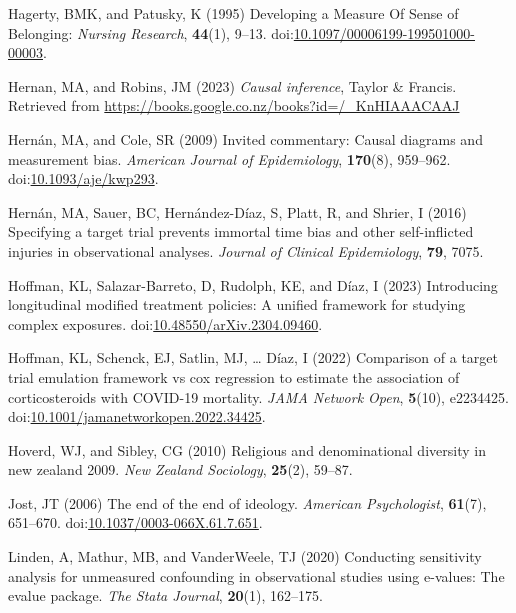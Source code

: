 \documentclass[
  singlecolumn]{article}
\newlength{\cslhangindent}
\newenvironment{CSLReferences}[2] %
 {\begin{list}{}{%
  \setlength{\itemindent}{0pt}
  \setlength{\leftmargin}{0pt}
  \setlength{\parsep}{0pt}
  \ifodd #1
   \setlength{\leftmargin}{\cslhangindent}
   \setlength{\itemindent}{-1\cslhangindent}
  \fi
  \setlength{\itemsep}{#2\baselineskip}}}
 {\end{list}}
\begin{document}
\begin{CSLReferences}{1}{0}
Hagerty, BMK, and Patusky, K (1995) Developing a Measure Of Sense of
Belonging: \emph{Nursing Research}, \textbf{44}(1), 9--13.
doi:\href{https://doi.org/10.1097/00006199-199501000-00003}{10.1097/00006199-199501000-00003}.

Hernan, MA, and Robins, JM (2023) \emph{Causal inference}, Taylor \&
Francis. Retrieved from
\url{https://books.google.co.nz/books?id=/_KnHIAAACAAJ}

Hernán, MA, and Cole, SR (2009) Invited commentary: Causal diagrams and
measurement bias. \emph{American Journal of Epidemiology},
\textbf{170}(8), 959--962.
doi:\href{https://doi.org/10.1093/aje/kwp293}{10.1093/aje/kwp293}.

Hernán, MA, Sauer, BC, Hernández-Díaz, S, Platt, R, and Shrier, I (2016)
Specifying a target trial prevents immortal time bias and other
self-inflicted injuries in observational analyses. \emph{Journal of
Clinical Epidemiology}, \textbf{79}, 7075.

Hoffman, KL, Salazar-Barreto, D, Rudolph, KE, and Díaz, I (2023)
Introducing longitudinal modified treatment policies: A unified
framework for studying complex exposures.
doi:\href{https://doi.org/10.48550/arXiv.2304.09460}{10.48550/arXiv.2304.09460}.

Hoffman, KL, Schenck, EJ, Satlin, MJ, \ldots{} Díaz, I (2022) Comparison
of a target trial emulation framework vs cox regression to estimate the
association of corticosteroids with COVID-19 mortality. \emph{JAMA
Network Open}, \textbf{5}(10), e2234425.
doi:\href{https://doi.org/10.1001/jamanetworkopen.2022.34425}{10.1001/jamanetworkopen.2022.34425}.

Hoverd, WJ, and Sibley, CG (2010) Religious and denominational diversity
in new zealand 2009. \emph{New Zealand Sociology}, \textbf{25}(2),
59--87.

Jost, JT (2006) The end of the end of ideology. \emph{American
Psychologist}, \textbf{61}(7), 651--670.
doi:\href{https://doi.org/10.1037/0003-066X.61.7.651}{10.1037/0003-066X.61.7.651}.

Linden, A, Mathur, MB, and VanderWeele, TJ (2020) Conducting sensitivity
analysis for unmeasured confounding in observational studies using
e-values: The evalue package. \emph{The Stata Journal}, \textbf{20}(1),
162--175.


\end{CSLReferences}
\end{document}
